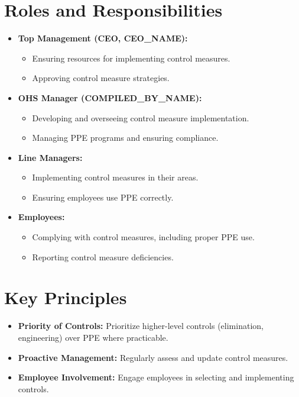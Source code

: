 \documentclass[12pt]{article}
\begin{document}
\section{Roles and Responsibilities}
\begin{itemize}
    \item \textbf{Top Management (CEO, {{CEO_NAME}}):}
    \begin{itemize}
        \item Ensuring resources for implementing control measures.
        \item Approving control measure strategies.
    \end{itemize}
    \item \textbf{OHS Manager ({{COMPILED_BY_NAME}}):}
    \begin{itemize}
        \item Developing and overseeing control measure implementation.
        \item Managing PPE programs and ensuring compliance.
    \end{itemize}
    \item \textbf{Line Managers:}
    \begin{itemize}
        \item Implementing control measures in their areas.
        \item Ensuring employees use PPE correctly.
    \end{itemize}
    \item \textbf{Employees:}
    \begin{itemize}
        \item Complying with control measures, including proper PPE use.
        \item Reporting control measure deficiencies.
    \end{itemize}
\end{itemize}

\section{Key Principles}
\begin{itemize}
    \item \textbf{Priority of Controls:} Prioritize higher-level controls (elimination, engineering) over PPE where practicable.
    \item \textbf{Proactive Management:} Regularly assess and update control measures.
    \item \textbf{Employee Involvement:} Engage employees in selecting and implementing controls.
\end{itemize}
\end{document}
